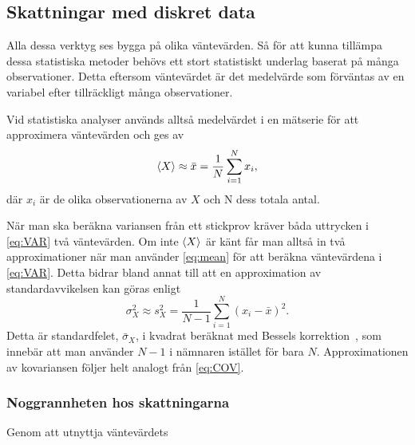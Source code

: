 \subsection{Skattningar med diskret data} \label{sec:diskret_data}
Alla dessa verktyg ses bygga på olika väntevärden. Så för att kunna tillämpa
dessa statistiska metoder behövs ett stort statistiskt underlag baserat på
många observationer. Detta eftersom väntevärdet är det medelvärde
som förväntas av en variabel efter tillräckligt många observationer.

Vid statistiska analyser används alltså medelvärdet i en
mätserie för att approximera väntevärden och ges av
\begin{equation}\label{eq:mean}
\ev{X} \approx \bar{x} = \frac{1}{N} \sum_{i=1}^N x_i,
\end{equation}
där $x_i$ är de olika observationerna av $X$ och N dess totala antal. 

När man ska beräkna variansen från ett stickprov kräver båda uttrycken
i \eqref{eq:VAR} två väntevärden. Om inte $\ev{X}$ är känt får man
alltså in två approximationer när man använder \eqref{eq:mean} för att
beräkna väntevärdena i \eqref{eq:VAR}. Detta bidrar bland annat till att en approximation av standardavvikelsen kan göras enligt
\begin{equation}
\sigma_X^2 \approx s_X^2
=  \frac{1}{N-1} \sum_{i=1}^N \left(x_i-\bar{x}\right)^2.
\end{equation}
Detta är standardfelet, $\bar{\sigma}_X$, i kvadrat beräknat med
Bessels korrektion~\cite{Rice_matstat2006}, som innebär att man använder ${N-1}$
i nämnaren istället för bara $N$. Approximationen av kovariansen
följer helt analogt från \eqref{eq:COV}.

\subsubsection{Noggrannheten hos skattningarna}
Genom att utnyttja väntevärdets 



